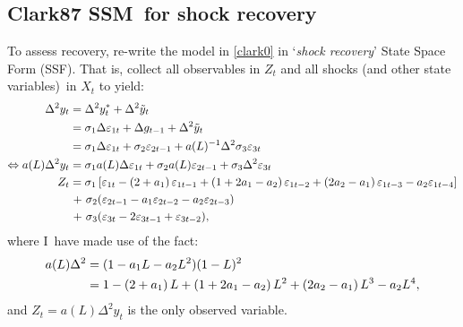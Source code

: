 \documentclass[a4paper,12pt]{article}
\begin{document}
\subsection{Clark87 SSM\ for shock recovery}

To assess recovery, re-write the model in \ref{clark0} in `\emph{shock
recovery}' State Space Form (SSF). That is, collect all observables in $Z_{t}
$ and all shocks (and other state variables)\ in $X_{t}$ to yield:%
\begin{align}
\Delta ^{2}y_{t}& =\Delta ^{2}y_{t}^{\ast }+\Delta ^{2}\tilde{y}_{t}  \notag
\label{Z} \\
& =\sigma _{1}\Delta \varepsilon _{1t}+\Delta g_{t-1}+\Delta ^{2}\tilde{y}%
_{t}  \notag \\
& =\sigma _{1}\Delta \varepsilon _{1t}+\sigma _{2}\varepsilon
_{2t-1}+a(L)^{-1}\Delta ^{2}\sigma _{3}\varepsilon _{3t}  \notag \\
\Leftrightarrow a(L)\Delta ^{2}y_{t}& =\sigma _{1}a(L)\Delta \varepsilon
_{1t}+\sigma _{2}a(L)\varepsilon _{2t-1}+\sigma _{3}\Delta ^{2}\varepsilon
_{3t}  \notag \\
Z_{t}& =\sigma _{1}\left[ \varepsilon _{1t}-\left( 2+a_{1}\right)
\varepsilon _{1t-1}+\left( 1+2a_{1}-a_{2}\right) \varepsilon _{1t-2}+\left(
2a_{2}-a_{1}\right) \varepsilon _{1t-3}-a_{2}\varepsilon _{1t-4}\right]  
\notag \\
& \hspace{1pt}+\hspace{1pt}\sigma _{2}(\varepsilon _{2t-1}-a_{1}\varepsilon
_{2t-2}-a_{2}\varepsilon _{2t-3}) \\
& \hspace{1pt}+\hspace{1pt}\sigma _{3}(\varepsilon _{3t}-2\varepsilon
_{3t-1}+\varepsilon _{3t-2}),  \notag
\end{align}%
where I\ have made use of the fact: 
\begin{align}
a(L)\Delta ^{2}& =(1-a_{1}L-a_{2}L^{2})(1-L)^{2}  \notag \\
& =1-\left( 2+a_{1}\right) L+\left( 1+2a_{1}-a_{2}\right) L^{2}+\left(
2a_{2}-a_{1}\right) L^{3}-a_{2}L^{4},  \label{expaL}
\end{align}%
and $Z_{t}=a(L)\Delta ^{2}y_{t}$ is the only observed variable.
\end{document}
